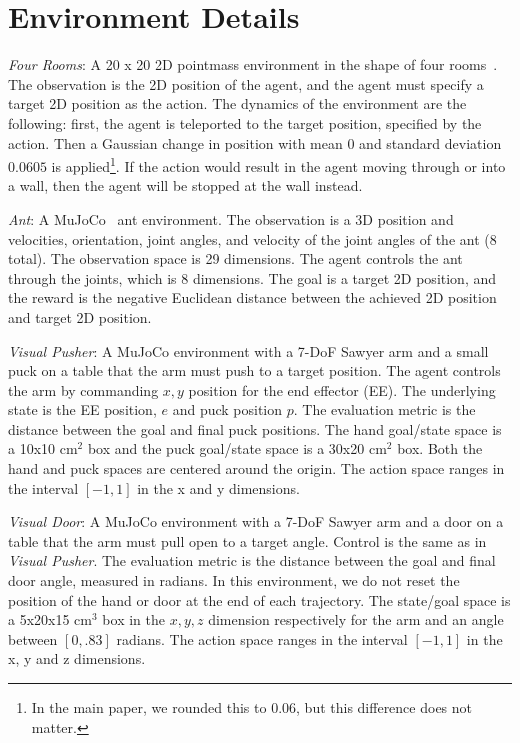 \section{Environment Details}\label{sec:environment-details}
\textit{Four Rooms}: A 20 x 20 2D pointmass environment in the shape of four rooms~\citep{sutton1999between}. The observation is the 2D position of the agent, and the agent must specify a target 2D position as the action.
The dynamics of the environment are the following:
first, the agent is teleported to the target position, specified by the action.
Then a Gaussian change in position with mean $0$ and standard deviation $0.0605$ is applied\footnote{In the main paper, we rounded this to $0.06$, but this difference does not matter.}.
If the action would result in the agent moving through or into a wall, then the agent will be stopped at the wall instead.

\textit{Ant}: A MuJoCo~\citep{todorov12mujoco} ant environment. The observation is a 3D position and velocities, orientation, joint angles, and velocity of the joint angles of the ant (8 total). The observation space is 29 dimensions.
The agent controls the ant through the joints, which is 8 dimensions. The goal is a target 2D position, and the reward is the negative Euclidean distance between the achieved 2D position and target 2D position.

\textit{Visual Pusher}: A MuJoCo environment with a 7-DoF Sawyer arm and a small puck on a table that the arm must push to a target position.
The agent controls the arm by commanding $x,y$ position for the end effector (EE).
The underlying state is the EE position, $e$ and puck position $p$.
The evaluation metric is the distance between the goal and final puck positions. The hand goal/state space is a 10x10 cm$^2$ box and the puck goal/state space is a 30x20 cm$^2$ box. Both the hand and puck spaces are centered around the origin. The action space ranges in the interval $[-1, 1]$ in the x and y dimensions.

\textit{Visual Door}: A MuJoCo environment with a 7-DoF Sawyer arm and a door on a table that the arm must pull open to a target angle.
Control is the same as in \textit{Visual Pusher}.
The evaluation metric is the distance between the goal and final door angle, measured in radians.
In this environment, we do not reset the position of the hand or door at the end of each trajectory. The state/goal space is a 5x20x15 cm$^3$ box in the $x, y, z$ dimension respectively for the arm and an angle between $[0, .83]$ radians. The action space ranges in the interval $[-1, 1]$ in the x, y and z dimensions.


